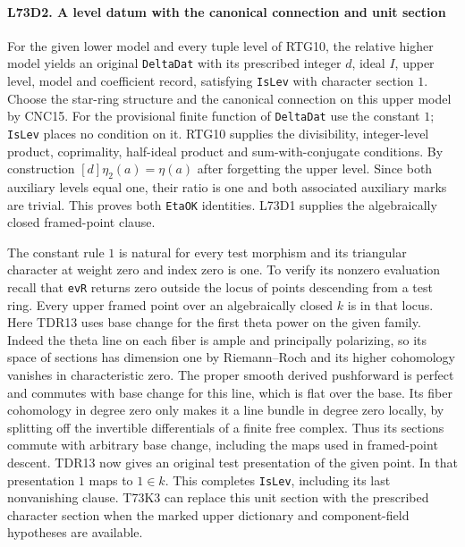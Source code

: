 \paragraph{L73D2. A level datum with the canonical connection and unit section}
For the given lower model and every tuple level of RTG10, the relative
higher model yields an original \texttt{DeltaDat} with its prescribed
integer $d$, ideal $I$, upper level, model and coefficient record,
satisfying \texttt{IsLev} with character section $1$. Choose the
star-ring structure and the canonical connection on this upper model
by CNC15. For the provisional finite function of \texttt{DeltaDat}
use the constant $1$; \texttt{IsLev} places no condition on it.
RTG10 supplies the divisibility, integer-level product, coprimality,
half-ideal product and sum-with-conjugate conditions. By construction
$[d]\eta_2(a)=\eta(a)$ after forgetting the upper level. Since both
auxiliary levels equal one, their ratio is one and both associated
auxiliary marks are trivial. This proves both \texttt{EtaOK}
identities. L73D1 supplies the algebraically closed framed-point
clause.

The constant rule $1$ is natural for every test morphism and its
triangular character at weight zero and index zero is one. To verify
its nonzero evaluation recall that \texttt{evR} returns zero outside
the locus of points descending from a test ring. Every upper framed
point over an algebraically closed $k$ is in that locus. Here TDR13
uses base change for the first theta power on the given family.
Indeed the theta line on each fiber is ample and principally
polarizing, so its space of sections has dimension one by
Riemann--Roch and its higher cohomology vanishes in characteristic
zero. The proper smooth derived pushforward is perfect and commutes
with base change for this line, which is flat over the base.
Its fiber cohomology in degree zero only makes it a line bundle in
degree zero locally, by splitting off the invertible differentials
of a finite free complex. Thus its sections commute with arbitrary
base change, including the maps used in framed-point descent.
TDR13 now gives an original test presentation of the given point.
In that presentation $1$ maps to $1\in k$. This completes
\texttt{IsLev}, including its last nonvanishing clause. T73K3 can
replace this unit section with the prescribed character section when
the marked upper dictionary and component-field hypotheses are
available.
